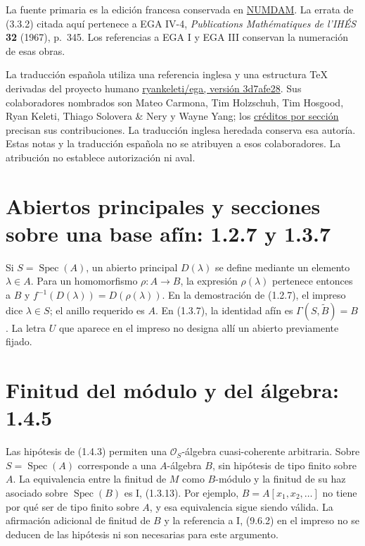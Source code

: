 \documentclass[11pt,a4paper]{article}
\DeclareMathOperator{\Spec}{Spec}
\begin{document}
La fuente primaria es la edición francesa conservada en
\href{https://numdam.org/item/PMIHES_1961__8__5_0/}{NUMDAM}.
La errata de (3.3.2) citada aquí pertenece a EGA IV-4,
\emph{Publications Mathématiques de l'IHÉS} \textbf{32} (1967),
p.~345. Los referencias a EGA I y EGA III conservan la numeración
de esas obras.

La traducción española utiliza una referencia inglesa y una
estructura TeX derivadas del proyecto humano
\href{https://github.com/ryankeleti/ega/tree/3d7afe28c99d1887ccdb85acf2ca1afd93fb1971}{ryankeleti/ega, versión 3d7afe28}.
Sus colaboradores nombrados son Mateo Carmona, Tim Holzschuh,
Tim Hosgood, Ryan Keleti, Thiago Solovera \& Nery y Wayne Yang;
los \href{https://github.com/ryankeleti/ega/blob/3d7afe28c99d1887ccdb85acf2ca1afd93fb1971/README.md}{créditos por sección}
precisan sus contribuciones. La traducción inglesa heredada
conserva esa autoría. Estas notas y la traducción española no
se atribuyen a esos colaboradores. La atribución no establece
autorización ni aval.


\section{Abiertos principales y secciones sobre una base afín: 1.2.7 y 1.3.7}
Si $S=\Spec(A)$, un abierto principal $D(\lambda)$ se define mediante
un elemento $\lambda\in A$. Para un homomorfismo $\rho:A\to B$,
la expresión $\rho(\lambda)$ pertenece entonces a $B$ y
$f^{-1}(D(\lambda))=D(\rho(\lambda))$. En la demostración de (1.2.7),
el impreso dice $\lambda\in S$; el anillo requerido es $A$.
En (1.3.7), la identidad afín es
$\Gamma(S,\widetilde B)=B$. La letra $U$ que aparece en el impreso
no designa allí un abierto previamente fijado.

\section{Finitud del módulo y del álgebra: 1.4.5}
Las hipótesis de (1.4.3) permiten una $\mathcal O_S$-álgebra
cuasi-coherente arbitraria. Sobre $S=\Spec(A)$ corresponde a una
$A$-álgebra $B$, sin hipótesis de tipo finito sobre $A$.
La equivalencia entre la finitud de $M$ como $B$-módulo y la finitud
de su haz asociado sobre $\Spec(B)$ es I, (1.3.13).
Por ejemplo, $B=A[x_1,x_2,\ldots]$ no tiene por qué ser de tipo finito
sobre $A$, y esa equivalencia sigue siendo válida. La afirmación
adicional de finitud de $B$ y la referencia a I, (9.6.2) en el impreso
no se deducen de las hipótesis ni son necesarias para este argumento.
\end{document}
